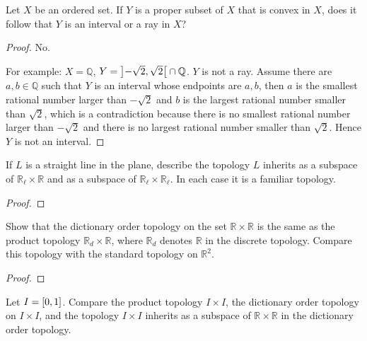 \begin{exercise}\label{chapter2:section16:exercise7}
    Let $X$ be an ordered set. If $Y$ is a proper subset of $X$ that is convex in $X$, does it follow that $Y$ is an interval or a ray in $X$?
\end{exercise}

\begin{proof}
    No.

    For example: $X = \mathbb{Q}$, $Y = \left]{-\sqrt{2}, \sqrt{2}}\right[\cap \mathbb{Q}$. $Y$ is not a ray. Assume there are $a, b\in\mathbb{Q}$ such that $Y$ is an interval whose endpoints are $a, b$, then $a$ is the smallest rational number larger than $-\sqrt{2}$ and $b$ is the largest rational number smaller than $\sqrt{2}$, which is a contradiction because there is no smallest rational number larger than $-\sqrt{2}$ and there is no largest rational number smaller than $\sqrt{2}$. Hence $Y$ is not an interval.
\end{proof}

\begin{exercise}\label{chapter2:section16:exercise8}
    If $L$ is a straight line in the plane, describe the topology $L$ inherits as a subspace of $\mathbb{R}_{\ell}\times\mathbb{R}$ and as a subspace of $\mathbb{R}_{\ell}\times\mathbb{R}_{\ell}$. In each case it is a familiar topology.
\end{exercise}

\begin{proof}
\end{proof}

\begin{exercise}\label{chapter2:section16:exercise9}
    Show that the dictionary order topology on the set $\mathbb{R}\times\mathbb{R}$ is the same as the product topology $\mathbb{R}_{d}\times\mathbb{R}$, where $\mathbb{R}_{d}$ denotes $\mathbb{R}$ in the discrete topology. Compare this topology with the standard topology on $\mathbb{R}^{2}$.
\end{exercise}

\begin{proof}
\end{proof}

\begin{exercise}\label{chapter2:section16:exercise10}
    Let $I = \left[{0, 1}\right]$. Compare the product topology $I\times I$, the dictionary order topology on $I\times I$, and the topology $I\times I$ inherits as a subspace of $\mathbb{R}\times\mathbb{R}$ in the dictionary order topology.
\end{exercise}

